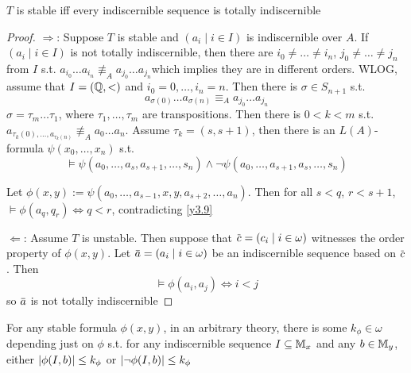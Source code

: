 \documentclass[11pt]{article}
\begin{document}
\begin{theorem}[]
\(T\) is stable iff every indiscernible sequence is totally indiscernible
\end{theorem}

\begin{proof}
\(\Rightarrow\): Suppose \(T\) is stable and \((a_i\mid i\in I)\) is indiscernible over \(A\).
If \((a_i\mid i\in I)\) is not totally indiscernible, then there are  \(i_0\neq\dots\neq i_n\), \(j_0\neq\dots\neq j_n\)
from \(I\) s.t. \(a_{i_0}\dots a_{i_n}\not\equiv_Aa_{j_0}\dots a_{j_n}\)which implies they are in different orders. WLOG, assume that \(I=(\mathbb{Q},<)\)
and \(i_0=0,\dots,i_n=n\). Then there is \(\sigma\in S_{n+1}\) s.t.
\begin{equation*}
a_{\sigma(0)}\dots a_{\sigma(n)}\equiv_Aa_{j_0}\dots a_{j_n}
\end{equation*}
\(\sigma=\tau_m\dots\tau_1\), where \(\tau_1,\dots,\tau_m\) are transpositions. Then there is \(0<k<m\)
s.t. \(a_{\tau_k(0),\dots,a_{\tau_k(n)}}\not\equiv_A a_0\dots a_n\). Assume \(\tau_k=(s,s+1)\), then there is
an \(L(A)\)-formula \(\psi(x_0,\dots,x_n)\) s.t.
\begin{equation*}
\vDash\psi(a_0,\dots,a_s,a_{s+1},\dots,s_n)\wedge\neg\psi(a_0,\dots,a_{s+1},a_s,\dots,s_n)
\end{equation*}

Let \(\phi(x,y):=\psi(a_0,\dots,a_{s-1},x,y,a_{s+2},\dots,a_n)\). Then for
all \(s<q\), \(r<s+1\), \(\vDash\phi(a_q,q_r)\Leftrightarrow q<r\), contradicting \ref{y3.9}

\(\Leftarrow\): Assume \(T\) is unstable. Then suppose that \(\barc=(c_i\mid i\in\omega)\) witnesses the order
property of \(\phi(x,y)\). Let \(\bara=(a_i\mid i\in\omega)\) be an indiscernible sequence based on \(\barc\).
Then
\begin{equation*}
\vDash\phi(a_i,a_j)\Leftrightarrow i<j
\end{equation*}
so \(\bara\) is not totally indiscernible
\end{proof}

\begin{proposition}[]
\label{y4.13}
For any stable formula \(\phi(x,y)\), in an arbitrary theory, there is some \(k_\phi\in\omega\) depending just
on \(\phi\) s.t. for any indiscernible sequence \(I\subseteq\mathbb{M}_x\) and any \(b\in\mathbb{M}_y\),
either \(\abs{\phi(I,b)}\le k_\phi\) or \(\abs{\neg\phi(I,b)}\le k_\phi\)
\end{proposition}
\end{document}
